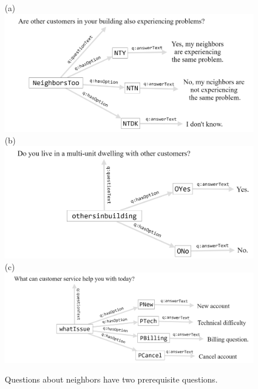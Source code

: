 \begin{figure}
\centering
(a)
\includegraphics[width=5in]{SWWOv3/media/ch12/figure12-6a.png}
(b)
\includegraphics[width=5in]{SWWOv3/media/ch12/figure12-6b.png}
(c)
\includegraphics[width=5in]{SWWOv3/media/ch12/figure12-6c.png}
\caption{Questions about neighbors have two prerequisite questions.}
\label{fig:ch12.06}
\end{figure}

